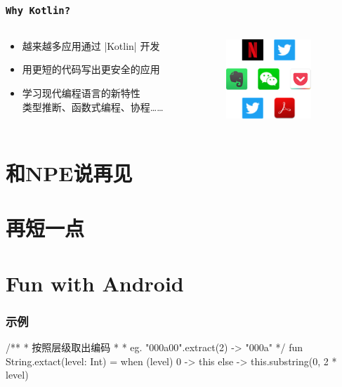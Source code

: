 \documentclass[aspectratio=169]{ctexbeamer}
\begin{document}
\begin{frame}[fragile]
    \frametitle{\texttt{Why Kotlin?}}
    \begin{columns}
        \begin{column}{0.5\textwidth}
            \begin{itemize}
                \item 越来越多应用通过 |Kotlin| 开发
                \item 用更\textcolor{yzlblue}{短}的代码写出更\textcolor{yzlblue}{安全}的应用
                \item 学习现代编程语言的新特性\\类型推断、函数式编程、协程……
            \end{itemize}
        \end{column}
        \begin{column}{0.5\textwidth}
            \begin{figure}
            \begin{center}
                \includegraphics[height=3cm]{fig/apps.png}
            \end{center}
            \end{figure}
        \end{column}
    \end{columns}
\end{frame}

\section{和NPE说再见}

\section{再短一点}

\section{Fun with Android}

\begin{frame}[fragile]
\frametitle{示例}
\begin{kotlincode}[basicstyle=\scriptsize\ttfamily,emph={[1]level}]
/**
 * 按照层级取出编码
 *
 * eg. "000a00".extract(2) -> "000a"
 */
fun String.extact(level: Int) = when (level) {
    0 -> this
    else -> this.substring(0, 2 * level)
}
\end{kotlincode}
\end{frame}
\end{document}
